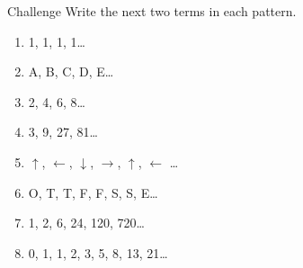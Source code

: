 \documentclass[12pt,letterpaper]{article}
\begin{document}
\begin{problem}{Challenge}
 Write the next two terms in each pattern.

 \begin{enumerate}[\hspace{1cm}a.]
  \item 1, 1, 1, 1\ldots
  \item A, B, C, D, E\ldots
  \item 2, 4, 6, 8\ldots
  \item 3, 9, 27, 81\ldots
  \item $\uparrow$, $\leftarrow$, $\downarrow$, $\rightarrow$, $\uparrow$,
  $\leftarrow$ \ldots
  \item O, T, T, F, F, S, S, E\ldots
  \item 1, 2, 6, 24, 120, 720\ldots
  \item 0, 1, 1, 2, 3, 5, 8, 13, 21\ldots
 \end{enumerate}

\end{problem}
\end{document}
